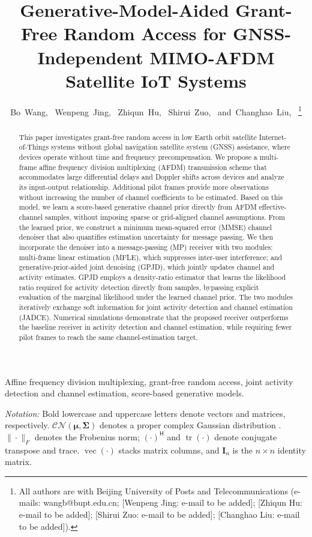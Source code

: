 \documentclass[10pt,journal,letterpaper]{IEEEtran}
\title{Generative-Model-Aided Grant-Free Random Access for GNSS-Independent MIMO-AFDM Satellite IoT Systems}
\author{Bo~Wang,~\IEEEmembership{Student~Member,~IEEE,}
Wenpeng~Jing,~\IEEEmembership{Member,~IEEE,}
Zhiqun~Hu,~\IEEEmembership{Member,~IEEE,}
Shirui~Zuo,~\IEEEmembership{Student~Member,~IEEE,}
and~Changhao~Liu,~\IEEEmembership{Student~Member,~IEEE}%
\thanks{All authors are with Beijing University of Posts and
Telecommunications (e-mails: wangb@bupt.edu.cn;
[Wenpeng Jing: e-mail to be added]; [Zhiqun Hu: e-mail to be added];
[Shirui Zuo: e-mail to be added]; [Changhao Liu: e-mail to be added]).}}
\newcommand{\CN}{\mathcal{CN}}
\newcommand{\I}{\mathbf{I}}
\newcommand{\vect}{\operatorname{vec}}
\newcommand{\tr}{\operatorname{tr}}
\begin{document}
\maketitle
\begin{abstract}
This paper investigates grant-free random access in low Earth orbit
satellite Internet-of-Things systems without global navigation satellite
system (GNSS) assistance, where devices operate without time and frequency
precompensation. We propose a multi-frame affine frequency division
multiplexing (AFDM) transmission scheme that accommodates large differential
delays and Doppler shifts across devices and analyze its input-output
relationship. Additional pilot frames provide more observations without
increasing the number of channel coefficients to be estimated. Based on this
model, we learn a score-based generative channel prior directly from AFDM
effective-channel samples, without imposing sparse or grid-aligned channel
assumptions. From the learned prior, we construct a minimum mean-squared
error (MMSE) channel denoiser that also quantifies estimation uncertainty
for message passing. We then incorporate the denoiser into a message-passing
(MP) receiver with two modules: multi-frame linear estimation (MFLE), which
suppresses inter-user interference; and generative-prior-aided joint
denoising (GPJD), which jointly updates channel and activity estimates. GPJD
employs a density-ratio estimator that learns the likelihood ratio required
for activity detection directly from samples, bypassing explicit evaluation
of the marginal likelihood under the learned channel prior. The two modules
iteratively exchange soft information for joint activity detection and
channel estimation (JADCE). Numerical simulations demonstrate that the
proposed receiver outperforms the baseline receiver in activity detection
and channel estimation, while requiring fewer pilot frames to reach the same
channel-estimation target.
\end{abstract}
\begin{IEEEkeywords}
Affine frequency division multiplexing, grant-free
random access, joint activity detection and channel estimation,
score-based generative models.
\end{IEEEkeywords}



\noindent\textit{Notation:} Bold lowercase and uppercase letters denote vectors and matrices, respectively. $\CN(\bm\mu,\bm\Sigma)$ denotes a proper complex Gaussian distribution \cite{neeser1993}.
$\|\cdot\|_F$ denotes the Frobenius norm;
$(\cdot)^{\mathsf H}$ and $\tr(\cdot)$ denote conjugate transpose and trace.
$\vect(\cdot)$ stacks matrix columns, and $\I_n$ is the $n\times n$ identity matrix.
\end{document}
